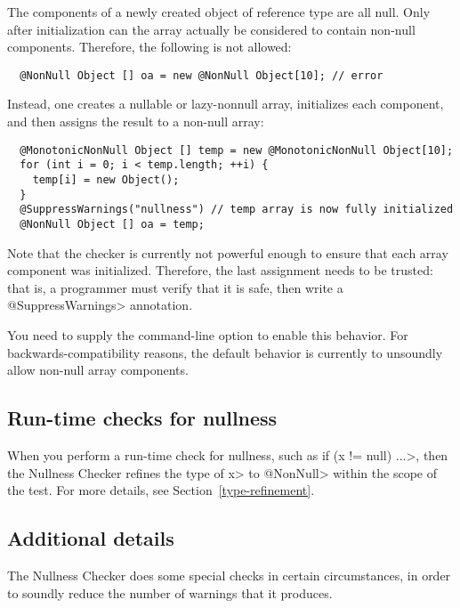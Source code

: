 The components of a newly created object of reference type are all
null. Only after initialization can the array actually be considered
to contain non-null components.
Therefore, the following is not allowed:

\begin{Verbatim}
  @NonNull Object [] oa = new @NonNull Object[10]; // error
\end{Verbatim}

Instead, one creates a nullable or lazy-nonnull array, initializes
each component, and then assigns the result to a non-null array:

\begin{Verbatim}
  @MonotonicNonNull Object [] temp = new @MonotonicNonNull Object[10];
  for (int i = 0; i < temp.length; ++i) {
    temp[i] = new Object();
  }
  @SuppressWarnings("nullness") // temp array is now fully initialized
  @NonNull Object [] oa = temp;
\end{Verbatim}

Note that the checker is currently not powerful enough to ensure that
each array component was initialized. Therefore, the last assignment
needs to be trusted:  that is, a programmer must verify that it is safe,
then write a \<@SuppressWarnings> annotation.


You need to supply the 
command-line option to enable this behavior.
For backwards-compatibility reasons, the default behavior is currently
to unsoundly allow non-null array components.


\subsection{Run-time checks for nullness\label{nullness-runtime-checks}}

When you perform a run-time check for nullness, such as \<if (x != null)
...>, then the Nullness Checker refines the type of \<x> to
\<@NonNull> within the scope of the test.  For more details, see
Section~\ref{type-refinement}.


\subsection{Additional details\label{nullness-additional-details}}

The Nullness Checker does some special checks in certain circumstances, in
order to soundly reduce the number of warnings that it produces.

